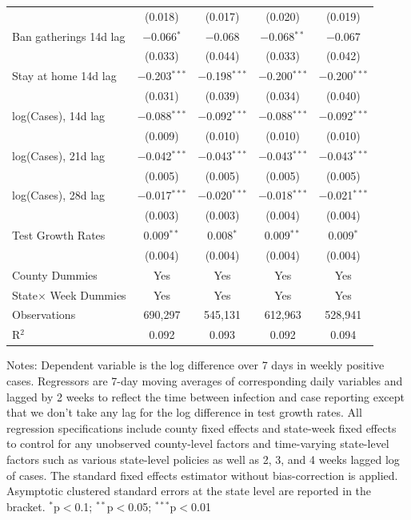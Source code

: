 \documentclass[9pt,twoside,lineno]{pnas-new}
\theoremstyle{definition}
\begin{document}
\begin{table}[!htbp]
{\begin{tabular}{@{\extracolsep{1pt}}lcc|cc}
  & (0.018) & (0.017) & (0.020) & (0.019) \\ 
 Ban gatherings 14d  lag & $-$0.066$^{*}$ & $-$0.068 & $-$0.068$^{**}$ & $-$0.067 \\ 
  & (0.033) & (0.044) & (0.033) & (0.042) \\ 
  Stay at home 14d  lag& $-$0.203$^{***}$ & $-$0.198$^{***}$ & $-$0.200$^{***}$ & $-$0.200$^{***}$ \\ 
  & (0.031) & (0.039) & (0.034) & (0.040) \\  \hline
   log(Cases), 14d  lag & $-$0.088$^{***}$ & $-$0.092$^{***}$ & $-$0.088$^{***}$ & $-$0.092$^{***}$ \\ 
  & (0.009) & (0.010) & (0.010) & (0.010) \\ 
  log(Cases), 21d  lag  & $-$0.042$^{***}$ & $-$0.043$^{***}$ & $-$0.043$^{***}$ & $-$0.043$^{***}$ \\ 
  & (0.005) & (0.005) & (0.005) & (0.005) \\ 
  log(Cases), 28d  lag& $-$0.017$^{***}$ & $-$0.020$^{***}$ & $-$0.018$^{***}$ & $-$0.021$^{***}$ \\ 
  & (0.003) & (0.003) & (0.004) & (0.004) \\ 
  Test Growth Rates & 0.009$^{**}$ & 0.008$^{*}$ & 0.009$^{**}$ & 0.009$^{*}$ \\ 
  & (0.004) & (0.004) & (0.004) & (0.004) \\ 
 \hline %
County Dummies & Yes & Yes &  Yes  &  Yes  \\   
State$\times$ Week Dummies&Yes & Yes &  Yes  &  Yes  \\
\hline %
Observations & 690,297 & 545,131 & 612,963 & 528,941 \\ 
R$^{2}$ & 0.092 & 0.093 & 0.092 & 0.094 \\  \hline 
\hline %
\end{tabular}}
  {\scriptsize
\begin{flushleft}
Notes: Dependent variable is the log difference over 7 days in weekly positive cases. Regressors are 7-day moving averages of corresponding daily variables and lagged by 2 weeks to reflect the time between infection and case reporting except that we don't take any lag for the log difference in test growth rates. All regression specifications include county fixed effects and state-week fixed effects to control for any unobserved county-level factors and time-varying state-level factors such as various state-level policies as well as 2, 3, and 4 weeks lagged log of cases. The standard fixed effects estimator without bias-correction is applied.  Asymptotic clustered standard errors at the state level are reported in the bracket.  {$^{*}$p$<$0.1; $^{**}$p$<$0.05; $^{***}$p$<$0.01}
\end{flushleft}}   
\end{table} 
\end{document}
